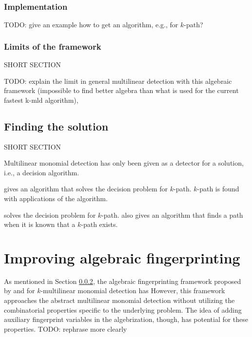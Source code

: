 \subsubsection{Implementation}

TODO: give an example how to get an algorithm, e.g., for $k$-path?

\subsubsection{Limits of the framework}
\label{sect:limits}

SHORT SECTION


TODO: explain the limit in general multilinear detection with this algebraic framework 
(impossible to find better algebra than what is used for the current fastest k-mld algorithm), \cite{KouWil09}

\subsection{Finding the solution}
\label{sect:finding_the_solution}

SHORT SECTION

Multilinear monomial detection has only been given as a detector for a solution,
i.e., a decision algorithm. 

\cite{Koutis08} gives an algorithm that solves the decision problem for $k$-path. 
$k$-path is found with  applications of the algorithm.

\cite{Williams09} solves the decision problem for $k$-path. \cite{Williams09} also gives an algorithm 
that finds a path when it is known that a $k$-path exists.

\clearpage

\section{Improving algebraic fingerprinting}

As mentioned in Section \ref{sect:limits}, the algebraic fingerprinting framework proposed by 
\citeauthor{Koutis08} and \citeauthor{Williams09} \cite{Williams09, KouWil15} for 
$k$-multilinear monomial detection has
However, this framework 
approaches the abstract multilinear monomial detection without 
utilizing the combinatorial properties specific to the underlying problem. 
The idea of adding auxiliary fingerprint variables in the algebrization, though, 
has potential for these properties. TODO: rephrase more clearly

